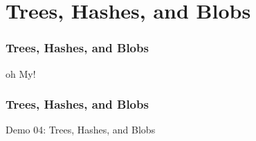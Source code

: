 \section[Section]{Trees, Hashes, and Blobs}

\begin{frame}
    \frametitle{Trees, Hashes, and Blobs}
    \alert{oh My!}
\end{frame}

\begin{frame}
    \frametitle{Trees, Hashes, and Blobs}
    \alert{Demo 04}: Trees, Hashes, and Blobs
\end{frame}
